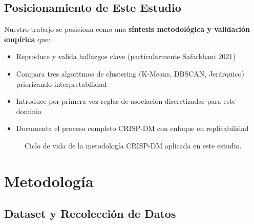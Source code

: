\documentclass[12pt,letterpaper]{article}
\begin{document}
\subsection{Posicionamiento de Este Estudio}

Nuestro trabajo se posiciona como una \textbf{síntesis metodológica y validación empírica} que:

\begin{itemize}
    \item Reproduce y valida hallazgos clave (particularmente Safarkhani 2021)
    \item Compara tres algoritmos de clustering (K-Means, DBSCAN, Jerárquico) priorizando interpretabilidad
    \item Introduce por primera vez reglas de asociación discretizadas para este dominio
    \item Documenta el proceso completo CRISP-DM con enfoque en replicabilidad
\end{itemize}

\begin{figure}[H]
    \centering
    \caption{Ciclo de vida de la metodología CRISP-DM aplicada en este estudio.}
    \label{fig:crisp_dm_scheme}
\end{figure}

\newpage
\section{Metodología}

\subsection{Dataset y Recolección de Datos}
\end{document}
